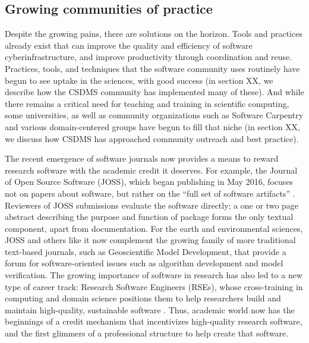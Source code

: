 \documentclass[12pt]{amsart}
\begin{document}
\subsection{Growing communities of practice}

Despite the growing pains, there are solutions on the horizon. Tools and practices already exist that can improve the quality and efficiency of software cyberinfrastructure, and improve productivity through coordination and reuse. Practices, tools, and techniques that the software community uses routinely have begun to see uptake in the sciences, with good success \citep{bangerth2013makes,turk2013scaling,hastings2014ten,wilson2014best,brown2014run,poisot2015best,hwang2017software,nanthaamornphong2017test,scott2017esip,taschuk2017ten,wilson2017good,benureau2018re,bryan2018excuse,adorf2018professionally,lathrop2019introduction} (in section XX, we describe how the CSDMS community has implemented many of these). And while there remains a critical need for teaching and training in scientific computing, some universities, as well as community organizations such as Software Carpentry and various domain-centered groups have begun to fill that niche \citep[e.g.,][]{jacobs2016experiences} (in section XX, we discuss how CSDMS has approached community outreach and best practice). 

The recent emergence of software journals now provides a means to reward research software with the academic credit it deserves. For example, the Journal of Open Source Software (JOSS), which began publishing in May 2016, focuses not on papers about software, but rather on the ``full set of software artifacts'' \citep{smith2018journal}. Reviewers of JOSS submissions evaluate the software directly; a one or two page abstract describing the purpose and function of package forms the only textual component, apart from documentation. For the earth and environmental sciences, JOSS and others like it now complement the growing family of more traditional text-based journals, such as Geoscientific Model Development, that provide a forum for software-oriented issues such as algorithm development and model verification. The growing importance of software in research has also led to a new type of career track: Research Software Engineers (RSEs), whose cross-training in computing and domain science positions them to help researchers build and maintain high-quality, sustainable software \citep{baxter2012research}. Thus, academic world now has the beginnings of a credit mechanism that incentivizes high-quality research software, and the first glimmers of a professional structure to help create that software. 
\end{document}
